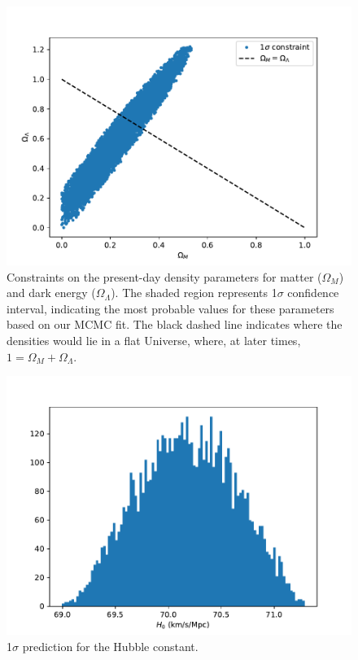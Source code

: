 \documentclass{aa}
\begin{document}
\begin{figure}[ht]
\centering
\includegraphics[width=\hsize]{figures/fitting.pdf}
  \caption{Constraints on the present-day density parameters for matter ($\Omega_M$) and dark energy ($\Omega_\Lambda$). The shaded region represents 1$\sigma$ confidence interval, indicating the most probable values for these parameters based on our MCMC fit. The black dashed line indicates where the densities would lie in a flat Universe, where, at later times, $1 = \Omega_M + \Omega_\Lambda$.}
     \label{fig:fitting}
\end{figure}

\begin{figure}[ht]
\centering
\includegraphics[width=\hsize]{figures/histogram.pdf}
  \caption{1$\sigma$ prediction for the Hubble constant.}
     \label{fit:hist}
\end{figure}
\end{document}
